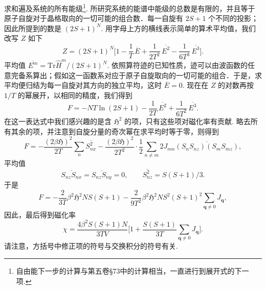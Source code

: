 求和遍及系统的所有能级\footnote{自由能下一步的计算与第五卷§73中的计算相当，一直进行到展开式的下一项.}. 所研究系统的能谱中能级的总数是有限的，并且等于原子自旋对于晶格取向的一切可能的组合数．每一自旋有 $2S+1$ 个不同的投影；因此所提到的数是 $(2S+1)^N$. 用字母上方的横线表示简单的算术平均值，我们改写 $Z$ 如下
\begin{equation*}
Z=(2S+1)^N\biggl[1-\frac{1}{T}\,\overline{\!E}
+\frac{1}{2T^2}\,\overline{\!E^2}-\frac{1}{6T^3}\,\overline{\!E^3}\biggr].
\end{equation*}
平均值 $\overline{\!E^m}=\mathrm{Tr}\hat{H}^m/(2S+1)^N$. 依照算符迹的已知性质，迹可以由波函数的任意完备系算出；假如这一函数系对应于原子自旋取向的一切可能的组合．于是，求平均便归结为每一自旋对其方向的独立平均，这时 $\overline{\!E}=0$. 现在在 $Z$ 的对数再按 $1/T$ 的幂展开，以相同的精度，我们得到
\begin{equation}
F=-NT\ln(2S+1)-\frac{1}{2T}\,\overline{\!E^2}
+\frac{1}{6T^2}\,\overline{\!E^3}.
\end{equation}
在这一表达式中我们感兴趣的是含 $\mathfrak{H}^2$ 的项，只有这些项对磁化率有贡献. 略去所有其余的项，并注意到自旋分量的奇次幂在求平均时等于零，则得到
\begin{equation*}
F=-\frac{(2\beta\mathfrak{H})^2}{2T}\sum_n\overline{S_{nx}^2}
-\frac{(2\beta\mathfrak{H})^2}{2T^2}\cdot\frac{1}{2}
\sum_{n\neq m}2J_{mn}\overline{(S_nS_{nz})(S_mS_{mz})},
\end{equation*}
平均值
\begin{equation*}
\overline{S_{nz}S_{nx}}=\overline{S_{nz}S_{ny}}=0,\qquad
\overline{S_{nz}^2}=S(S+1)/3.
\end{equation*}
于是
\begin{equation*}
F=-\frac{2}{3T}\beta^2\mathfrak{H}^2NS(S+1)
-\frac{2}{9T^2}\beta^2\mathfrak{H}^2NS^2(S+1)^2
\sum_{\bm{q}\neq0}J_{\bm{q}},
\end{equation*}
因此，最后得到磁化率
\begin{equation}
\chi=\frac{4\beta^2S(S+1)N}{3TV}
\biggl[1+\frac{S(S+1)}{3T}\sum_{\bm{q}\neq0}J_{\bm{q}}\biggr].
\end{equation}
请注意，方括号中修正项的符号与交换积分的符号有关.

